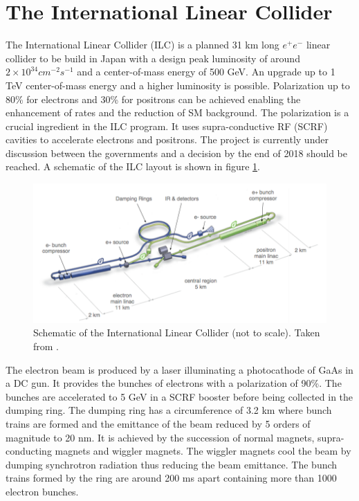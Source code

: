 \section{The International Linear Collider}
\label{sec:ILC}

The International Linear Collider (ILC) is a planned 31 km long $e^+e^-$ linear collider to be build in Japan with a design peak luminosity of around $2 \times 10^{34} cm^{-2}s^{-1}$ and a center-of-mass energy of 500 GeV. An upgrade up to 1 TeV center-of-mass energy and a higher luminosity is possible. Polarization up to 80\% for electrons and 30\% for positrons can be achieved enabling the enhancement of rates and the reduction of SM background. The polarization is a crucial ingredient in the ILC program. It uses supra-conductive RF (SCRF) cavities to accelerate electrons and positrons. The project is currently under discussion between the governments and a decision by the end of 2018 should be reached. A schematic of the ILC layout is shown in figure \ref{fig:ILC_schematic}.

\begin{figure}[htbp!]
  \centering
  \includegraphics[width=0.7\linewidth]{chap2/fig/ILC_schematic.png}
  \caption{Schematic of the International Linear Collider (not to scale). Taken from \cite{ILC_TDR_Vol1}.} \label{fig:ILC_schematic}
\end{figure}

The electron beam is produced by a laser illuminating a photocathode of GaAs in a DC gun. It provides the bunches of electrons with a polarization of 90\%. The bunches are accelerated to 5 GeV in a SCRF booster before being collected in the dumping ring. The dumping ring has a circumference of 3.2 km where bunch trains are formed and the emittance of the beam reduced by 5 orders of magnitude to 20 nm. It is achieved by the succession of normal magnets, supra-conducting magnets and wiggler magnets. The wiggler magnets cool the beam by dumping synchrotron radiation thus reducing the beam emittance. The bunch trains formed by the ring are around 200 ms apart containing more than 1000 electron bunches.

